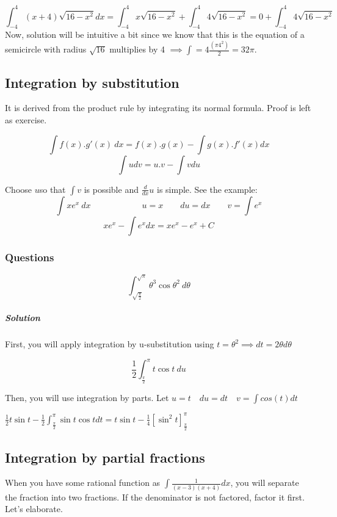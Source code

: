 \documentclass{article}
\begin{document}
\begin{enumerate}[1.]
\[ \int^4_{-4} (x+4) \sqrt{ 16-x^2 } dx 
	= \int^4_{-4} x  \sqrt{ 16-x^2 } + \int^4_{-4} 4  \sqrt{ 16-x^2 } = 0 + \int^4_{-4} 4  \sqrt{ 16-x^2 }
		\]
		Now, solution will be intuitive a bit since we know that this is the equation of a semicircle with radius $ \sqrt{16} $ multiplies by 4 $ \implies \int = 4 \frac{ (\pi 4^2) } {2} = 32\pi  $.
\subsection{Integration by substitution}

It is derived from the product rule by integrating its normal formula. Proof is left as exercise.

\[
	\int f(x). g'(x)\ dx=f(x).g(x)-\int g(x).f'(x) dx
\]
\[
	\int u dv = u.v - \int v du 
\]

Choose $ u $so that $ \int{v}$ is possible and $ \frac{d}{dx} u $ is simple. See the example:
\[
	\int x e^x\ dx \qquad \qquad \qquad u = x \qquad du = dx \qquad  v = \int e^x
\]
\[
	xe^x- \int e^x dx  = xe^x-e^x+C
\]

\subsubsection{Questions}

\[
	\int^{\sqrt{\pi}}_{\sqrt{\frac{\pi}{2}}} \theta^3 \cos{ \theta^2 }\ d \theta  
\]
\subparagraph{Solution}
First, you will apply integration by u-substitution using $ t = \theta^2 \implies dt = 2\theta d \theta$  

\[
\frac{1}{2}	\int^{\pi}_{\frac{\pi}{2}} t \cos{ t }\ du 
\]

Then, you will use integration by parts. Let $ u = t \quad du = dt \quad v = \int cos(t)dt$

$ \frac{1}{2} t \sin{ t } - \frac{1}{2} \int^{\pi}_{\frac{\pi}{2}} \sin{ t } \cos{ t } dt = t \sin t - \frac{1}{4} [\sin^2{ t }]^{\pi}_{\frac{\pi}{2}} $

		
\end{enumerate}

\subsection{Integration by partial fractions}

When you have some rational function as $ \int \frac{1}{(x-3)(x+4)} dx $, you will separate the fraction into two fractions. If the denominator is not factored, factor it first. Let's elaborate.
\end{document}
